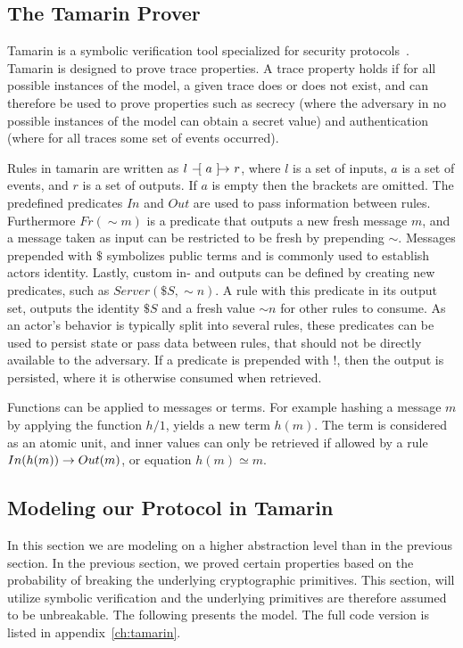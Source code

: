 \subsection{The Tamarin Prover}
Tamarin is a symbolic verification tool specialized for security protocols~\cite{meier2013tamarin}. Tamarin is designed to prove trace properties. A trace property holds if for all possible instances of the model, a given trace does or does not exist, and can therefore be used to prove properties such as secrecy (where the adversary in no possible instances of the model can obtain a secret value) and authentication (where for all traces some set of events occurred).

Rules in tamarin are written as $l \ifarrow[a] r$, where $l$ is a set of inputs, $a$ is a set of events, and $r$ is a set of outputs. If $a$ is empty then the brackets are omitted. The predefined predicates $In$ and $Out$ are used to pass information between rules. Furthermore $Fr({\sim}m)$ is a predicate that outputs a new fresh message $m$, and a message taken as input can be restricted to be fresh by prepending ${\sim}$. Messages prepended with $\$$ symbolizes public terms and is commonly used to establish actors identity. Lastly, custom in- and outputs can be defined by creating new predicates, such as $Server(\$S, {\sim}n)$. A rule with this predicate in its output set, outputs the identity $\$S$ and a fresh value ${\sim}n$ for other rules to consume. As an actor's behavior is typically split into several rules, these predicates can be used to persist state or pass data between rules, that should not be directly available to the adversary. If a predicate is prepended with $!$, then the output is persisted, where it is otherwise consumed when retrieved.

Functions can be applied to messages or terms. For example hashing a message $m$ by applying the function $h/1$, yields a new term $h(m)$. The term is considered as an atomic unit, and inner values can only be retrieved if allowed by a rule $In(h(m)) \ifarrow Out(m)$, or equation $h(m) \simeq m$.

\subsection{Modeling our Protocol in Tamarin}
In this section we are modeling on a higher abstraction level than in the previous section. In the previous section, we proved certain properties based on the probability of breaking the underlying cryptographic primitives. This section, will utilize symbolic verification and the underlying primitives are therefore assumed to be unbreakable. The following presents the model. The full code version is listed in appendix~\ref{ch:tamarin}.

